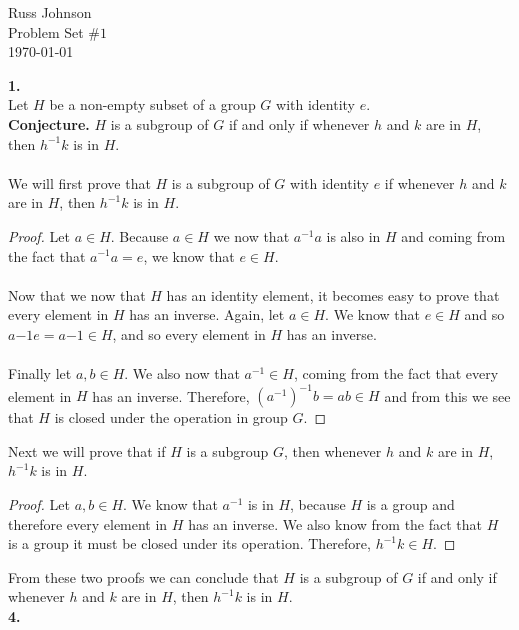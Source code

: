\documentclass[11pt,a4paper]{article}
\begin{document}
\begin{flushright}
Russ Johnson\\
Problem Set $\#1$\\
\today\\
\end{flushright}

{\bf 1.}\\
Let $H$ be a non-empty subset of a group $G$ with identity $e$.\\
{\bf Conjecture.} $H$ is a subgroup of $G$ if and only if whenever $h$ and $k$ are in $H$, then $h^{-1}k$ is in $H$.\\
~\\
We will first prove that $H$ is a subgroup of $G$ with identity $e$ if whenever $h$ and $k$ are in $H$, then $h^{-1}k$ is in $H$.
\begin{proof}
Let $a\in H$. Because $a\in H$ we now that $a^{-1}a$ is also in $H$ and coming from the fact that $a^{-1}a = e$, we know that $e\in H$.\\
~\\
Now that we now that $H$ has an identity element, it becomes easy to prove that every element in $H$ has an inverse. Again, let $a\in H$. We know that $e\in H$ and so $a{-1}e = a{-1} \in H$, and so every element in $H$ has an inverse.\\
~\\
Finally let $a,b \in H$. We also now that $a^{-1}\in H$, coming from the fact that every element in $H$ has an inverse. Therefore, $(a^{-1})^{-1}b = ab\in H$ and from this we see that $H$ is closed under the operation in group $G$.
\end{proof}

Next we will prove that if $H$ is a subgroup $G$, then whenever $h$ and $k$ are in $H$, $h^{-1}k$ is in $H$.

\begin{proof}
Let $a,b\in H$. We know that $a^{-1}$ is in $H$, because $H$ is a group and therefore every element in $H$ has an inverse. We also know from the fact that $H$ is a group it must be closed under its operation. Therefore, $h^{-1}k \in H$.
\end{proof} 

From these two proofs we can conclude that $H$ is a subgroup of $G$ if and only if whenever $h$ and $k$ are in $H$, then $h^{-1}k$ is in $H$.\\

{\bf 4.}
\end{document}
